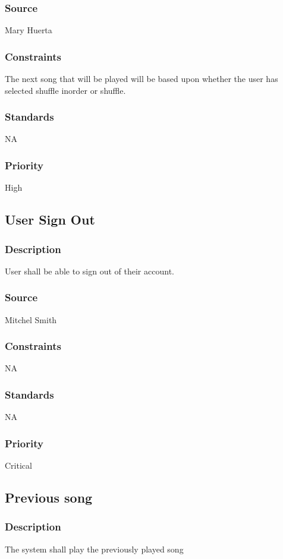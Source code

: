 \subsubsection{Source}
Mary Huerta
\subsubsection{Constraints}
The next song that will be played will be based upon whether the user has selected shuffle inorder or shuffle.
\subsubsection{Standards}
NA
\subsubsection{Priority}
High



\subsection{User Sign Out}
\subsubsection{Description}
User shall be able to sign out of their account.
\subsubsection{Source}
Mitchel Smith
\subsubsection{Constraints}
NA
\subsubsection{Standards}
NA
\subsubsection{Priority}
Critical




\subsection{Previous song}
\subsubsection{Description}
The system shall play the previously played song
